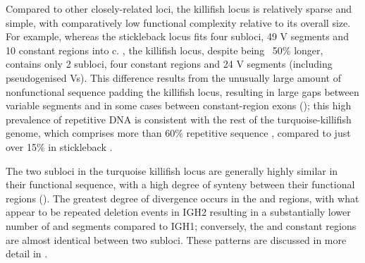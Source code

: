 Compared to other closely-related loci, the killifish locus is relatively sparse and simple, with comparatively low functional complexity relative to its overall size. For example, whereas the stickleback locus fits four subloci, 49 V segments and 10 constant regions into c.  \parencite{bao2010stickleback,gambondeza2011stickleback}, the killifish locus, despite being ~50\% longer, contains only 2 subloci, four constant regions and 24 V segments (including pseudogenised Vs). This difference results from the unusually large amount of nonfunctional sequence padding the killifish locus, resulting in large gaps between variable segments and in some cases between constant-region exons (); this high prevalence of repetitive DNA is consistent with the rest of the turquoise-killifish genome, which comprises more than 60\% repetitive sequence \parencite{willemsen2019popgen}, compared to just over 15\% in stickleback \parencite{yuan2018repeats}. %
	
The two subloci in the turquoise killifish locus are generally highly similar in their functional sequence, with a high degree of synteny between their functional regions (). The greatest degree of divergence occurs in the \vh and \dh regions, with what appear to be repeated deletion events in IGH2 resulting in a substantially lower number of \vh and \dh segments compared to IGH1; conversely, the \jh and constant regions are almost identical between two subloci. These patterns are discussed in more detail in .
	
